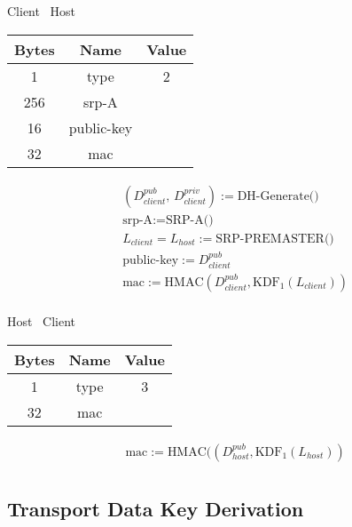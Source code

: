 \begin{center}
    Client \textrightarrow\ Host\\
    \begin{tabular}{|c|c|c|}
        \hline
        \textbf{Bytes} & \textbf{Name} & \textbf{Value} \\
        \hline
        1              & type          & 2              \\
        \hline
        256            & srp-A         &                \\
        \hline
        16             & public-key    &                \\
        \hline
        32             & mac           &                \\
        \hline
    \end{tabular}
\end{center}

\begin{align*}
    & (D_{client}^{pub},\, D_{client}^{priv}) := \text{DH-Generate()}\\
    & \text{srp-A} := \text{SRP-A()}\\
    & L_{client} = L_{host} := \text{SRP-PREMASTER()}\\
    & \text{public-key} := D_{client}^{pub}\\
    & \text{mac} := \text{HMAC}(D_{client}^{pub}, \text{KDF}_1(L_{client}))\\
\end{align*}

\begin{center}
    Host \textrightarrow\ Client\\
    \begin{tabular}{|c|c|c|}
        \hline
        \textbf{Bytes} & \textbf{Name} & \textbf{Value} \\
        \hline
        1              & type          & 3              \\
        \hline
        32             & mac           &                \\
        \hline
    \end{tabular}
\end{center}

\begin{align*}
    & \text{mac} := \text{HMAC}((D_{host}^{pub},\text{KDF}_1(L_{host}))\\
\end{align*}

\subsection{Transport Data Key Derivation}

